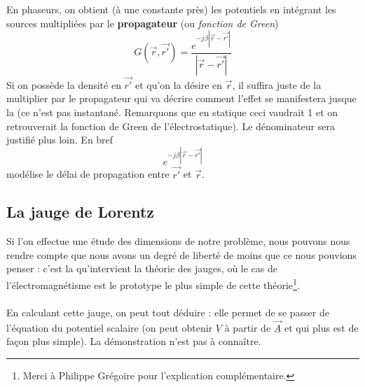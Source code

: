 	En phaseurs, on obtient (à une constante près) les potentiels en intégrant les sources 
	multipliées par le \textbf{propagateur} (ou \textit{fonction de Green})
	\begin{equation}
	G(\vec{r},\vec{r'}) = \dfrac{e^{-j\beta|\vec{r}-\vec{r'}|}}{|\vec{r}-\vec{r'}|}
	\end{equation}
	Si on possède la densité en $\vec{r'}$ et qu'on la désire en $\vec{r}$, il suffira juste 
	de la multiplier par le propagateur qui va décrire comment l'effet se manifestera jusque la 
	(ce n'est pas instantané. Remarquons que en statique ceci vaudrait 1 et on retrouverait la 
	fonction de Green de l'électrostatique). Le dénominateur sera justifié plus loin. En bref
	\begin{equation}
	e^{-j\beta|\vec{r}-\vec{r'}|}
	\end{equation}
	modélise le délai de propagation entre $\vec{r'}$ et $\vec{r}$.\\
	
	
	\subsection{La jauge de Lorentz}
	Si l'on effectue une étude des dimensions de notre problème, nous pouvons nous rendre compte 
	que nous avons un degré de liberté de moins que ce nous pouvions penser : c'est la qu'intervient 
	la théorie des jauges, où le cas de l'électromagnétisme est le prototype le plus simple de 
	cette théorie\footnote{Merci à Philippe Grégoire pour l'explication complémentaire.}.\\
	\ \\
	
	En calculant cette jauge, on peut tout déduire : elle permet de se passer de l'équation du 
	potentiel scalaire (on peut obtenir $\underline{V}$ à partir de $\underline{\vec{A}}$ et 
	qui plus est de façon plus simple). La démonstration n'est pas à connaître.
	
